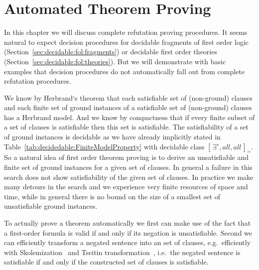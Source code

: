 
\chapter{Automated Theorem Proving}\label{chapter:automation}



In this chapter we will discuss complete refutation proving procedures.
It seems natural to expect decision procedures
for decidable fragments of first order logic
(Section~\ref{sec:decidable:fol:fragments})
or decidable first order theories (Section~\ref{sec:decidable:fol:theories}).
But we will demonstrate with basic examples
that decision procedures do not automatically
fall out from complete refutation procedures.


%
We know by Herbrand`s theorem
that each satisfiable set of (non-ground) clauses
and each finite set of ground instances of a satisfiable set of (non-ground) clauses
has a Herbrand model.
And we know by compactness
that if every finite subset of a set of clauses is satisfiable then this set is satisfiable.
The satisfiability of a set of ground instances is decidable
as we have already implicitly stated in Table~\vref{tab:decidedable:FiniteModelProperty}
with decidable class \( {[ \, \exists^{∗}, all, all \, ]}_{=} \).
So a natural idea of first order theorem proving
is to derive an unsatisfiable and finite set of ground instances for a given set of clauses.
In general a failure in this search does not show satisfiability of the given set of clauses.
In practice we make many detours in the search and we experience very finite resources of space and time,
while in general there is no bound on the size of a smallest set of unsatisfiable ground instances.



To actually prove a theorem automatically \cite{books/el/RobinsonV01}
we first can make use of the fact that a first-order formula is valid if and only if its negation is unsatisfiable.
Second we can efficiently transform a negated sentence into an
 set of clauses,
e.g.~efficiently with Skolemization~\cite{books/el/RV01/Hahnle01} 
and Tseitin transformation~\cite{tseitin70},
i.e.~the negated sentence is satisfiable if and only if the constructed 
set of clauses is satisfiable.

